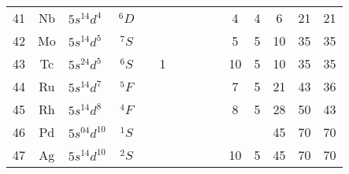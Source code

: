 \begin{table}
\begin{center}
\begin{tabular}{cclcccccccccccc}
41&Nb & $5s^14d^4$ &$^6D$&&    &    &   &     &    & 4 & 4 & 6  & 21 & 21  \\
42&Mo & $5s^14d^5$ &$^7S$&&    &    &   &     &    & 5 & 5 & 10 & 35 & 35  \\
43&Tc & $5s^24d^5$ &$^6S$&& 1  &    &   &     &    &10 & 5 & 10 & 35 & 35  \\
44&Ru & $5s^14d^7$ &$^5F$&&    &    &   &     &    & 7 & 5 & 21 & 43 & 36  \\
45&Rh & $5s^14d^8$ &$^4F$&&    &    &   &     &    & 8 & 5 & 28 & 50 & 43  \\
46&Pd & $5s^04d^{10}$&$^1S$&&  &    &   &     &    &   &   & 45 & 70 & 70  \\
47&Ag & $5s^14d^{10}$&$^2S$&&  &    &   &     &    &10 & 5 & 45 & 70 & 70  \\
\hline
\end{tabular}
\end{center}
\end{table}

